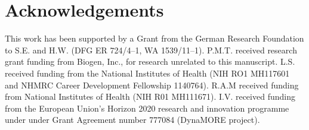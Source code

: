 \documentclass{lea}
\begin{document}








\section{Acknowledgements}

This work has been supported by a Grant from the German Research
Foundation to S.E. and H.W. (DFG ER 724/4--1, WA 1539/11--1).
P.M.T. received research grant funding from Biogen, Inc., for research
unrelated to this manuscript.
L.S. received funding from the National Institutes of Health (NIH RO1
MH117601 and NHMRC Career Development Fellowship 1140764).
R.A.M received funding from National Institutes of Health (NIH R01
MH111671).
I.V. received funding from the European Union's Horizon 2020 research
and innovation programme under under Grant Agreement number 777084
(DynaMORE project).

\printbibliography
\end{document}
